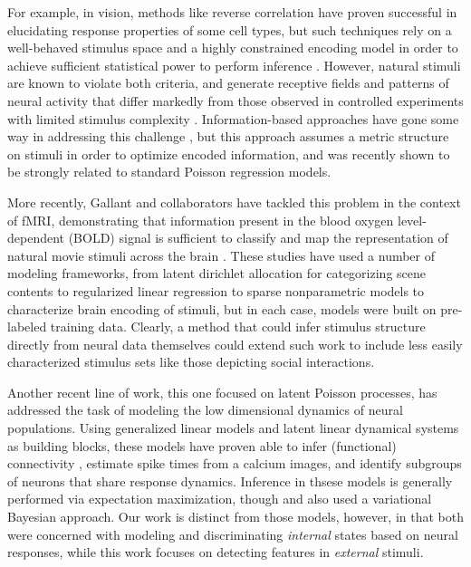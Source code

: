 \documentclass{article} %
\begin{document}
For example, in vision, methods like reverse correlation have proven successful in elucidating response properties of some cell types, but such techniques rely on a well-behaved stimulus space and a highly constrained encoding model in order to achieve sufficient statistical power to perform inference \cite{steveninck1988realtime,ringach2004reverse,ringach2002receptive}. However, natural stimuli are known to violate both criteria, and generate receptive fields and patterns of neural activity that differ markedly from those observed in controlled experiments with limited stimulus complexity \cite{ringach2002receptive,sharpee2004analyzing,Vinje2000-dx}. Information-based approaches have gone some way in addressing this challenge \cite{sharpee2004analyzing}, but this approach assumes a metric structure on stimuli in order to optimize encoded information, and was recently shown to be strongly related to standard Poisson regression models\cite{Williamson2013-rg}.

More recently, Gallant and collaborators have tackled this problem in the context of fMRI, demonstrating that information present in the blood oxygen level-dependent (BOLD) signal is sufficient to classify and map the representation of natural movie stimuli across the brain \cite{Kay2008-gd,Vu2011-da,Huth2012-cj,Stansbury2013-nm}. These studies have used a number of modeling frameworks, from latent dirichlet allocation for categorizing scene contents \cite{Stansbury2013-nm} to regularized linear regression \cite{Huth2012-cj} to sparse nonparametric models \cite{Vu2011-da} to characterize brain encoding of stimuli, but in each case, models were built on pre-labeled training data. Clearly, a method that could infer stimulus structure directly from neural data themselves could extend such work to include less easily characterized stimulus sets like those depicting social interactions.

Another recent line of work, this one focused on latent Poisson processes, has addressed the task of modeling the low dimensional dynamics of neural populations\cite{Pillow2008-em,Vogelstein2009-ax,Park2014-el,Buesing2014-ta}. Using generalized linear models and latent linear dynamical systems as building blocks, these models have proven able to infer (functional) connectivity \cite{Pillow2008-em}, estimate spike times from a calcium images\cite{Vogelstein2009-ax}, and identify subgroups of neurons that share response dynamics\cite{Buesing2014-ta}. Inference in thsese models is generally performed via expectation maximization, though \cite{Ulrich2014-zc} and \cite{Putzky2014-up} also used a variational Bayesian approach. Our work is distinct from those models, however, in that both were concerned with modeling and discriminating \emph{internal} states based on neural responses, while this work focuses on detecting features in \emph{external} stimuli. 
\end{document}
